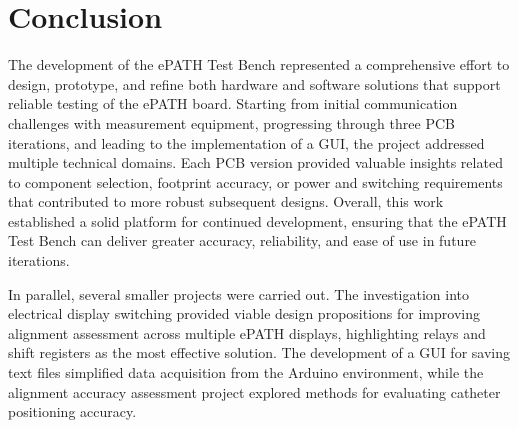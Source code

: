 
\section{Conclusion}
The development of the ePATH Test Bench represented a comprehensive effort to design, prototype, and refine both hardware and software solutions that support reliable testing of the ePATH board. Starting from initial communication challenges with measurement equipment, progressing through three PCB iterations, and leading to the implementation of a GUI, the project addressed multiple technical domains. Each PCB version provided valuable insights related to component selection, footprint accuracy, or power and switching requirements that contributed to more robust subsequent designs. Overall, this work established a solid platform for continued development, ensuring that the ePATH Test Bench can deliver greater accuracy, reliability, and ease of use in future iterations.

In parallel, several smaller projects were carried out. The investigation into electrical display switching provided viable design propositions for improving alignment assessment across multiple ePATH displays, highlighting relays and shift registers as the most effective solution. The development of a GUI for saving text files simplified data acquisition from the Arduino environment, while the alignment accuracy assessment project explored methods for evaluating catheter positioning accuracy.  


\newpage
